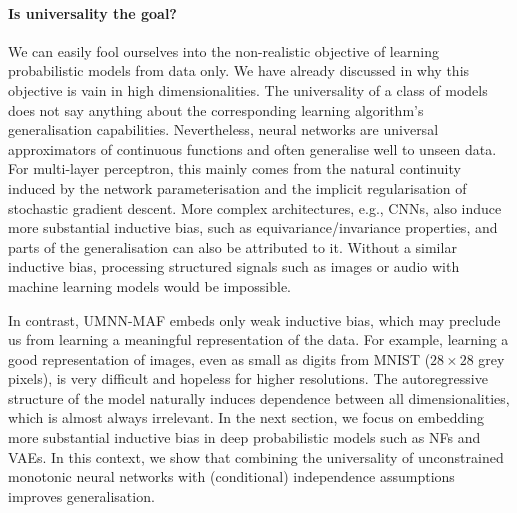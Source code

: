 
\paragraph{Is universality the goal?}
We can easily fool ourselves into the non-realistic objective of learning probabilistic models from data only. We have already discussed in  why this objective is vain in high dimensionalities. The universality of a class of models does not say anything about the corresponding learning algorithm's generalisation capabilities. Nevertheless, neural networks are universal approximators of continuous functions and often generalise well to unseen data. For multi-layer perceptron, this mainly comes from the natural continuity induced by the network parameterisation and the implicit regularisation of stochastic gradient descent. More complex architectures, e.g., CNNs, also induce more substantial inductive bias, such as equivariance/invariance properties, and parts of the generalisation can also be attributed to it. Without a similar inductive bias, processing structured signals such as images or audio with machine learning models would be impossible.

In contrast, UMNN-MAF embeds only weak inductive bias, which may preclude us from learning a meaningful representation of the data. For example, learning a good representation of images, even as small as digits from MNIST ($28 \times 28$ grey pixels), is very difficult and hopeless for higher resolutions. The autoregressive structure of the model naturally induces dependence between all dimensionalities, which is almost always irrelevant. In the next section, we focus on embedding more substantial inductive bias in deep probabilistic models such as NFs and VAEs. In this context, we show that combining the universality of unconstrained monotonic neural networks with (conditional) independence assumptions improves generalisation.

